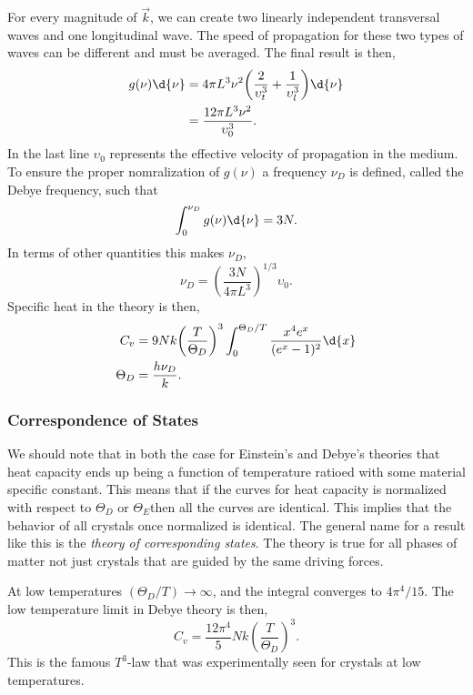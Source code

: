 For every magnitude of $\vec{k}$, we can create two linearly independent
transversal waves and one longitudinal wave. The speed of propagation for these
two types of waves can be different and must be averaged. The final result is
then,
\begin{align*}
	g(\nu) \d{\nu} &= 4\pi L^3 \nu^2 {\left(\frac{2}{\upsilon_t^3} +
	\frac{1}{\upsilon_{l}^3}\right)} \d{\nu}\\
				   &= \frac{12\pi L^3 \nu^2}{\upsilon_{0}^3}.
\end{align*}
In the last line $\upsilon_0$ represents the effective velocity of propagation
in the medium. To ensure the proper nomralization of $g(\nu)$ a frequency
$\nu_D$ is defined, called the Debye frequency, such that
\begin{equation*}
	\int_{0}^{\nu_D}{g(\nu)\d{\nu}} = 3N.
\end{equation*}
In terms of other quantities this makes $\nu_{D}$,
\begin{equation*}
	\nu_D = {\left(\frac{3N}{4\pi L^3}\right)}^{1/3} \upsilon_0.
\end{equation*}
Specific heat in the theory is then,
\begin{align*}
	C_v &= 9Nk{\left(\frac{T}{\Theta_{D}}\right)}^3 \int_{0}^{\Theta_D
	/T}{\frac{x^4 e^x}{(e^{x} - 1)^2} \d{x}}\\
		\Theta_D &= \frac{h \nu_D}{k}.
\end{align*}

\subsubsection{Correspondence of States}
We should note that in both the case for Einstein's and Debye's theories that
heat capacity ends up being a function of temperature ratioed with some material
specific constant. This means that if the curves for heat capacity is normalized
with respect to $\Theta_{D}$ or $ \Theta_E$then all the curves are identical.
This implies that the behavior of all crystals once normalized is identical. The
general name for a result like this is the \textit{theory of corresponding
states}. The theory is true for all phases of matter not just crystals that are
guided by the same driving forces.

At low temperatures $(\Theta_D / T) \to \infty$, and the integral converges to
$4\pi^4 / 15$. The low temperature limit in Debye theory is then,
\begin{equation*}
	C_v = \frac{12\pi^4}{5} Nk {\left(\frac{T}{\Theta_{D}}\right)}^3.
\end{equation*}
This is the famous $T^3$-law that was experimentally seen for crystals at low
temperatures.

